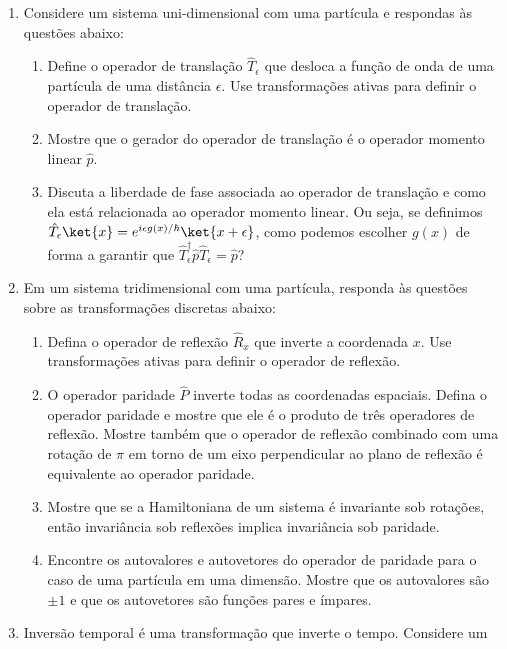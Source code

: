 \begin{enumerate}
	\item Considere um sistema uni-dimensional com uma partícula e respondas às
	      questões abaixo:
	      \begin{enumerate}
		      \item Define o operador de translação $\hat{T}_\epsilon$ que desloca a
		            função de onda de uma partícula de uma distância $\epsilon$. Use
		            transformações ativas para definir o operador de translação.
		      \item Mostre que o gerador do operador de translação é o operador momento
		            linear $\hat{p}$.
		      \item Discuta a liberdade de fase associada ao operador de translação e
		            como ela está relacionada ao operador momento linear. Ou seja, se
		            definimos $\hat{T}_\epsilon\ket{x} = e^{i\epsilon
					            g(x)/\hbar}\ket{x+\epsilon}$, como podemos escolher $g(x)$ de forma
		            a garantir que $\hat{T}^\dagger_\epsilon\hat{p}\hat{T}_\epsilon =
			            \hat{p}$?
	      \end{enumerate}
	\item Em um sistema tridimensional com uma partícula, responda às questões sobre as
	      transformações discretas abaixo:
	      \begin{enumerate}
		      \item Defina o operador de reflexão $\hat{R}_x$ que inverte a coordenada
		            $x$. Use transformações ativas para definir o operador de reflexão.
		      \item O operador paridade $\hat{P}$ inverte todas as coordenadas espaciais.
		            Defina o operador paridade e mostre que ele é o produto de três operadores
		            de reflexão. Mostre também que o operador de reflexão combinado com uma
		            rotação de $\pi$ em torno de um eixo perpendicular ao plano de reflexão
		            é equivalente ao operador paridade.
		      \item Mostre que se a Hamiltoniana de um sistema é invariante sob rotações,
		            então invariância sob reflexões implica invariância sob paridade.
		      \item Encontre os autovalores e autovetores do operador de paridade para o
		            caso de uma partícula em uma dimensão. Mostre que os autovalores são
		            $\pm1$ e que os autovetores são funções pares e ímpares.
	      \end{enumerate}
	\item Inversão temporal é uma transformação que inverte o tempo. Considere um

\end{enumerate}
